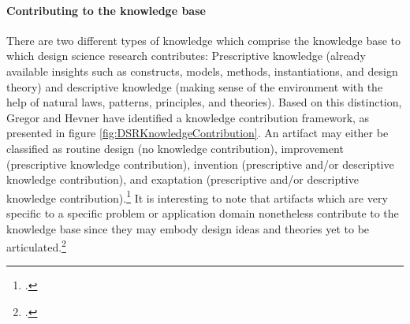 \paragraph{Contributing to the knowledge base} There are two different types of knowledge which comprise the knowledge base to which design science research contributes: Prescriptive knowledge (already available insights such as constructs, models, methods, instantiations, and design theory) and descriptive knowledge (making sense of the environment with the help of natural laws, patterns, principles, and theories). Based on this distinction, Gregor and Hevner have identified a knowledge contribution framework, as presented in figure \ref{fig:DSRKnowledgeContribution}. An artifact may either be classified as routine design (no knowledge contribution), improvement (prescriptive knowledge contribution), invention (prescriptive and/or descriptive knowledge contribution), and exaptation (prescriptive and/or descriptive knowledge contribution).\footcite[Cf.][pp.344 et seq]{GregorPositioningpresentingdesign2013} It is interesting to note that artifacts which are very specific to a specific problem or application domain nonetheless contribute to the knowledge base since they may embody design ideas and theories yet to be articulated.\footcite[Cf.][p.340]{GregorPositioningpresentingdesign2013}

